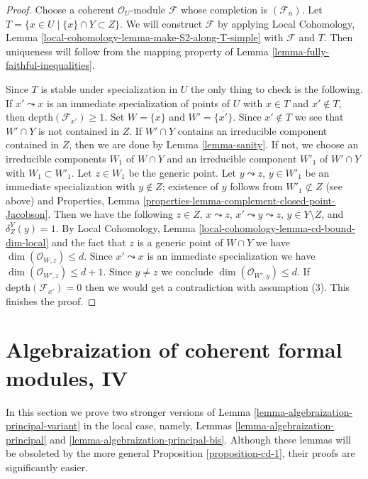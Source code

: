\begin{proof}
Choose a coherent $\mathcal{O}_U$-module $\mathcal{F}$ whose
completion is $(\mathcal{F}_n)$. Let
$T = \{x \in U \mid \overline{\{x\}} \cap Y \subset Z\}$.
We will construct $\mathcal{F}$ by applying Local Cohomology,
Lemma \ref{local-cohomology-lemma-make-S2-along-T-simple}
with $\mathcal{F}$ and $T$.
Then uniqueness will follow from the mapping property
of Lemma \ref{lemma-fully-faithful-inequalities}.

\medskip\noindent
Since $T$ is stable under specialization in $U$ the only
thing to check is the following. If $x' \leadsto x$ is an
immediate specialization of points of $U$ with $x \in T$
and $x' \not \in T$, then $\text{depth}(\mathcal{F}_{x'}) \geq 1$.
Set $W = \overline{\{x\}}$ and $W' = \overline{\{x'\}}$.
Since $x' \not \in T$ we see that $W' \cap Y$ is not contained in $Z$.
If $W' \cap Y$ contains an irreducible component contained in $Z$,
then we are done by Lemma \ref{lemma-sanity}.
If not, we choose an irreducible components $W_1$ of $W \cap Y$ and
an irreducible component $W'_1$ of $W' \cap Y$ with $W_1 \subset W'_1$.
Let $z \in W_1$ be the generic point. Let $y \leadsto z$, $y \in W'_1$
be an immediate specialization with $y \not \in Z$; existence of $y$
follows from $W'_1 \not \subset Z$ (see above) and
Properties, Lemma \ref{properties-lemma-complement-closed-point-Jacobson}.
Then we have the following $z \in Z$, $x \leadsto z$,
$x' \leadsto y \leadsto z$, $y \in Y \setminus Z$, and $\delta^Y_Z(y) = 1$.
By Local Cohomology, Lemma \ref{local-cohomology-lemma-cd-bound-dim-local}
and the fact that $z$
is a generic point of $W \cap Y$ we have
$\dim(\mathcal{O}_{W, z}) \leq d$.
Since $x' \leadsto x$ is an immediate specialization we have
$\dim(\mathcal{O}_{W', z}) \leq d + 1$.
Since $y \not = z$ we conclude
$\dim(\mathcal{O}_{W', y}) \leq d$.
If $\text{depth}(\mathcal{F}_{x'}) = 0$ then we would get
a contradiction with assumption (3). This finishes the proof.
\end{proof}








\section{Algebraization of coherent formal modules, IV}
\label{section-algebraization-modules-local}

\noindent
In this section we prove two stronger versions of
Lemma \ref{lemma-algebraization-principal-variant}
in the local case, namely, Lemmas \ref{lemma-algebraization-principal}
and \ref{lemma-algebraization-principal-bis}.
Although these lemmas will be obsoleted by the more general
Proposition \ref{proposition-cd-1}, their proofs are significantly
easier.

